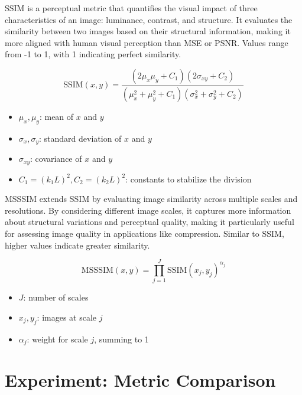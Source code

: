 \Gls{SSIM} is a perceptual metric that quantifies the visual impact of three characteristics of an image: luminance, contrast, and structure. It evaluates the similarity between two images based on their structural information, making it more aligned with human visual perception than MSE or PSNR. Values range from -1 to 1, with 1 indicating perfect similarity.
\begin{note}
    {}
    \begin{equation}    
        \text{SSIM}(x, y) = \frac{(2\mu_x \mu_y + C_1)(2\sigma_{xy} + C_2)}{(\mu_x^2 + \mu_y^2 + C_1)(\sigma_x^2 + \sigma_y^2 + C_2)}
    \end{equation}
    \begin{itemize}
        \item $\mu_x, \mu_y$: mean of $x$ and $y$
        \item $\sigma_x, \sigma_y$: standard deviation of $x$ and $y$
        \item $\sigma_{xy}$: covariance of $x$ and $y$
        \item $C_1 = (k_1L)^2, C_2 = (k_2L)^2$: constants to stabilize the division
    \end{itemize}
\end{note}

\Gls{MSSSIM} extends \gls{SSIM} by evaluating image similarity across multiple scales and resolutions. By considering different image scales, it captures more information about structural variations and perceptual quality, making it particularly useful for assessing image quality in applications like compression. Similar to \gls{SSIM}, higher values indicate greater similarity.

\begin{note}
    {}
    \begin{equation}    
        \text{MSSSIM}(x, y) = \prod_{j=1}^{J} \text{SSIM}(x_j, y_j)^{\alpha_j}
    \end{equation}
    \begin{itemize}
        \item $J$: number of scales
        \item $x_j, y_j$: images at scale $j$
        \item $\alpha_j$: weight for scale $j$, summing to 1
    \end{itemize}
\end{note}


\section{Experiment: Metric Comparison}\label{sec:metric_comparison_experiment}


